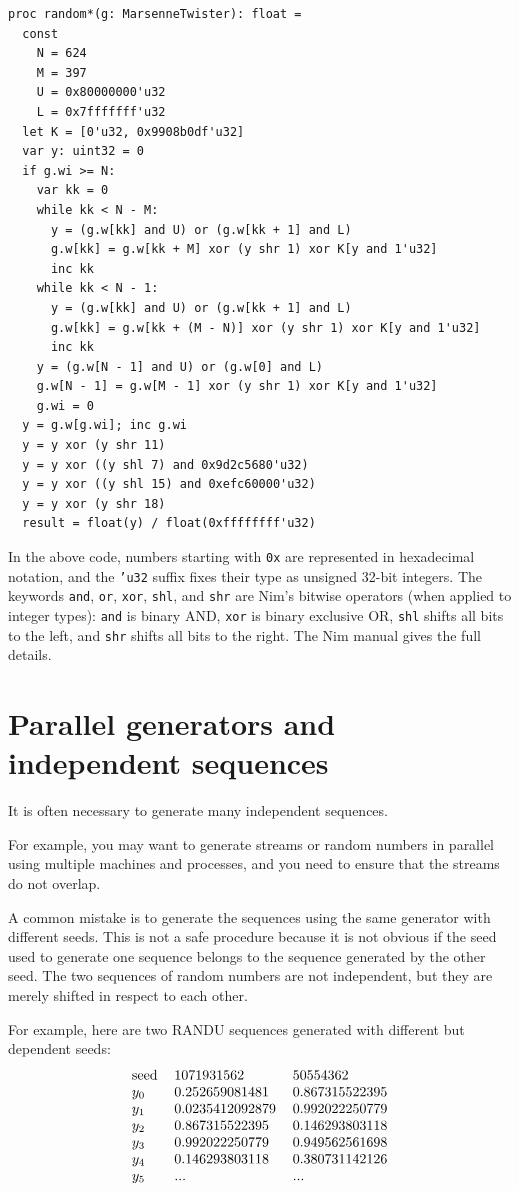 \documentclass[justified, sixbynine]{tufte-book}
\def\ft{\small\tt}
\theoremstyle{plain}%
\newtheorem * {corollary}{Corollary}
\theoremstyle{definition}
\theoremstyle{remark}
\newtheorem * {remark}{Remark}
\newtheorem * {note}{Note}
\begin{document}
\begin{fullwidth}
\begin{lstlisting}[caption={in file: {\ft nlib/randomgen.nim}}]
proc random*(g: MarsenneTwister): float =
  const
    N = 624
    M = 397
    U = 0x80000000'u32
    L = 0x7fffffff'u32
  let K = [0'u32, 0x9908b0df'u32]
  var y: uint32 = 0
  if g.wi >= N:
    var kk = 0
    while kk < N - M:
      y = (g.w[kk] and U) or (g.w[kk + 1] and L)
      g.w[kk] = g.w[kk + M] xor (y shr 1) xor K[y and 1'u32]
      inc kk
    while kk < N - 1:
      y = (g.w[kk] and U) or (g.w[kk + 1] and L)
      g.w[kk] = g.w[kk + (M - N)] xor (y shr 1) xor K[y and 1'u32]
      inc kk
    y = (g.w[N - 1] and U) or (g.w[0] and L)
    g.w[N - 1] = g.w[M - 1] xor (y shr 1) xor K[y and 1'u32]
    g.wi = 0
  y = g.w[g.wi]; inc g.wi
  y = y xor (y shr 11)
  y = y xor ((y shl 7) and 0x9d2c5680'u32)
  y = y xor ((y shl 15) and 0xefc60000'u32)
  y = y xor (y shr 18)
  result = float(y) / float(0xffffffff'u32)
\end{lstlisting}

In the above code, numbers starting with \verb!0x! are represented in hexadecimal notation, and the {\ft 'u32} suffix fixes their type as unsigned 32-bit integers. The keywords {\ft and}, {\ft or}, {\ft xor}, {\ft shl}, and {\ft shr} are Nim's bitwise operators (when applied to integer types): {\ft and} is binary AND, {\ft xor} is binary exclusive OR, {\ft shl} shifts all bits to the left, and {\ft shr} shifts all bits to the right. The Nim manual gives the full details.

\goodbreak\section{Parallel generators and independent sequences}

It is often necessary to generate many independent sequences.

For example, you may want to generate streams or random numbers in parallel using multiple machines and processes, and you need to ensure that the streams do not overlap.

A common mistake is to generate the sequences using the same
generator with different seeds. This is not a safe procedure because it is
not obvious if the seed used to generate one sequence belongs to the
sequence generated by the other seed. The two
sequences of random numbers are not independent, but they are merely
shifted in respect to each other.

For example, here are two RANDU sequences generated with different but dependent
seeds:
\begin{equation}
\begin{tabular}{lll}
seed & 1071931562 & 50554362 \\
$y_0$ & 0.252659081481 & 0.867315522395 \\
$y_1$ & 0.0235412092879 & 0.992022250779 \\
$y_2$ & 0.867315522395 & 0.146293803118 \\
$y_3$ & 0.992022250779 & 0.949562561698 \\
$y_4$ & 0.146293803118 & 0.380731142126 \\
$y_5$ & ... & ...
\end{tabular}
\end{equation}


\end{fullwidth}
\end{document}
